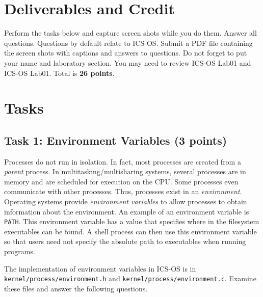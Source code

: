 \documentclass[a4paper, 11pt,oneside]{article}
\begin{document}
\section{Deliverables and Credit}
Perform the tasks below and capture screen shots while you do them. Answer
all questions. Questions by default relate to ICS-OS. Submit a PDF file containing the screen shots with captions 
and answers to questions. Do not forget to put your name and laboratory
section. You may need to review ICS-OS Lab01 and ICS-OS Lab01. Total is \textbf{26 points}.

\section{Tasks}

\subsection*{Task 1: Environment Variables (3 points)} 
Processes do not run in isolation. In fact, most processes are created from a \textit{parent} process. 
In multitasking/multisharing systems, several processes are in memory and are scheduled for execution 
on the CPU. Some processes even communicate with other processes. Thus, processes exist in an \textit{environment}. Operating systems provide \textit{environment variables} to allow processes to obtain information about the environment. An example of an environment variable is \texttt{PATH}. This 
environment variable has a value that specifies where in the filesystem executables 
can be found. A shell process can then use this environment variable so that users need not specify the absolute path to executables when running programs.

The implementation of environment variables in ICS-OS is in \texttt{kernel/process/environment.h} and 
\texttt{kernel/process/environment.c}. Examine these files and answer the following questions.



\noindent{}
\end{document}
